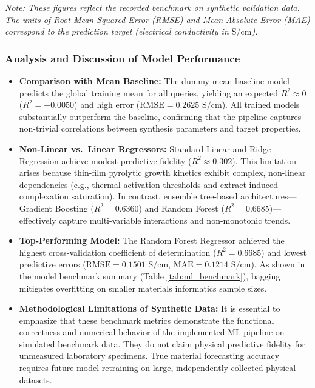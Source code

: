 \documentclass[12pt,a4paper,oneside]{report}
\begin{document}
{{{\noindent\textit{Note: These figures reflect the recorded benchmark on synthetic validation data. The units of Root Mean Squared Error (RMSE) and Mean Absolute Error (MAE) correspond to the prediction target (electrical conductivity in $\text{S/cm}$).}

\subsubsection{Analysis and Discussion of Model Performance}

\begin{itemize}
    \item \textbf{Comparison with Mean Baseline:} The dummy mean baseline model predicts the global training mean for all queries, yielding an expected $R^2 \approx 0$ ($R^2 = -0.0050$) and high error ($\text{RMSE} = 0.2625\text{ S/cm}$). All trained models substantially outperform the baseline, confirming that the pipeline captures non-trivial correlations between synthesis parameters and target properties.
    \item \textbf{Non-Linear vs.\ Linear Regressors:} Standard Linear and Ridge Regression achieve modest predictive fidelity ($R^2 \approx 0.302$). This limitation arises because thin-film pyrolytic growth kinetics exhibit complex, non-linear dependencies (e.g., thermal activation thresholds and extract-induced complexation saturation). In contrast, ensemble tree-based architectures—Gradient Boosting ($R^2 = 0.6360$) and Random Forest ($R^2 = 0.6685$)—effectively capture multi-variable interactions and non-monotonic trends.
    \item \textbf{Top-Performing Model:} The Random Forest Regressor achieved the highest cross-validation coefficient of determination ($R^2 = 0.6685$) and lowest predictive errors ($\text{RMSE} = 0.1501\text{ S/cm}$, $\text{MAE} = 0.1214\text{ S/cm}$). As shown in the model benchmark summary (Table \ref{tab:ml_benchmark}), bagging mitigates overfitting on smaller materials informatics sample sizes.
    \item \textbf{Methodological Limitations of Synthetic Data:} It is essential to emphasize that these benchmark metrics demonstrate the functional correctness and numerical behavior of the implemented ML pipeline on simulated benchmark data. They do not claim physical predictive fidelity for unmeasured laboratory specimens. True material forecasting accuracy requires future model retraining on large, independently collected physical datasets.
\end{itemize}

}}}
\end{document}

